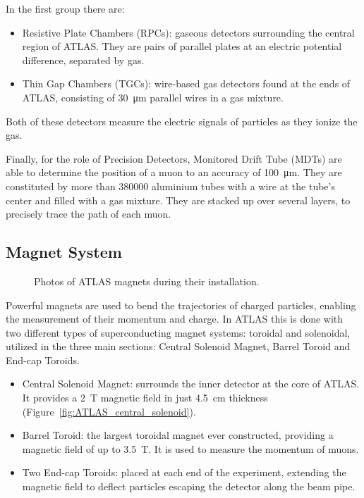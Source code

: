 In the first group there are: 
\begin{itemize}
    \item Resistive Plate Chambers (RPCs): gaseous detectors surrounding the central region of ATLAS. They are pairs of parallel plates at an electric potential difference, separated by gas.
    \item Thin Gap Chambers (TGCs): wire-based gas detectors found at the ends of ATLAS, consisting of \qty{30}{\micro\meter} parallel wires in a gas mixture.
\end{itemize}
Both of these detectors measure the electric signals of particles as they ionize the gas.

Finally, for the role of Precision Detectors, Monitored Drift Tube (MDTs) are able to determine the position of a muon to an accuracy of \qty{100}{\micro\meter}. They are constituted by more than \num{380000} aluminium tubes with a wire at the tube's center and filled with a gas mixture. They are stacked up over several layers, to precisely trace the path of each muon.

\subsection{Magnet System}\label{sec:magnet_system}

\begin{figure}[h!tbp]
    \centering
    \hfill
    \centering
    \caption{Photos of ATLAS magnets during their installation.}
\end{figure}

Powerful magnets are used to bend the trajectories of charged particles, enabling the measurement of their momentum and charge. In ATLAS this is done with two different types of superconducting magnet systems: toroidal and solenoidal, utilized in the three main sections: Central Solenoid Magnet, Barrel Toroid and End-cap Toroids.
\begin{itemize}
    \item Central Solenoid Magnet: surrounds the inner detector at the core of ATLAS. It provides a \qty{2}{\tesla} magnetic field in just \qty{4.5}{\centi\meter} thickness (Figure~\ref{fig:ATLAS_central_solenoid}).
    \item Barrel Toroid: the largest toroidal magnet ever constructed, providing a magnetic field of up to \qty{3.5}{\tesla}. It is used to measure the momentum of muons.
    \item Two End-cap Toroids: placed at each end of the experiment, extending the magnetic field to deflect particles escaping the detector along the beam pipe.
\end{itemize}

